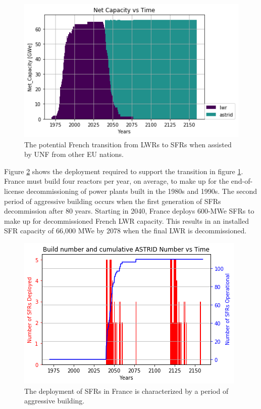 \begin{figure}[htbp!]
        \begin{center}
                \includegraphics[scale=0.6]{./images/french-transition/power_plot.png}
        \end{center}
        \caption{The potential French transition from \glspl{LWR} to 
                \glspl{SFR} when assisted by \gls{UNF} from other \gls{EU} 
        nations.}
        \label{fig:sfr_num}
\end{figure}

Figure \ref{fig:dep} shows the deployment required to support the transition in 
figure \ref{fig:sfr_num}. France must build four reactors per year, on average, to 
make up for the end-of-license decommissioning of power plants built in the 1980s and 1990s.  The second period of aggressive building occurs when the first generation of \glspl{SFR} decommission after 80 years. Starting in 2040, France deploys 600-\gls{MWe} \glspl{SFR} to make up for 
decommissioned French \gls{LWR} capacity. This results in an installed 
\gls{SFR} 
capacity of 66,000 \gls{MWe} by 2078 when the final \gls{LWR} is 
decommissioned. 



\begin{figure}[htbp!]
    \begin{center}
        \includegraphics[scale=0.6]{./images/french-transition/sfr_deploy.png}
    \end{center}
    \caption{The deployment of \glspl{SFR} in France is characterized by a period of
    aggressive building.}
    \label{fig:dep}
\end{figure}


